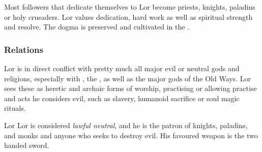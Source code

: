 Most followers that dedicate themselves to Lor become priests, knights,
paladins or holy crusaders. Lor values dedication, hard work as well as
spiritual strength and resolve. The dogma is preserved and cultivated in the
.

\subsubsection{Relations}

Lor is in direct conflict with pretty much all major evil or neutral gods and
religions, especially with , the ,
as well as the major gods of the Old Ways. Lor sees these as heretic and
archaic forms of worship, practising or allowing practise and acts he considers
evil, such as slavery, humanoid sacrifice or soul magic rituals.

\begin{35e}{Lor}
  Lor is considered \emph{lawful neutral}, and he is the patron of knights,
  paladins, and monks and anyone who seeks to destroy evil. His favoured
  weapon is the two handed sword.
\end{35e}
